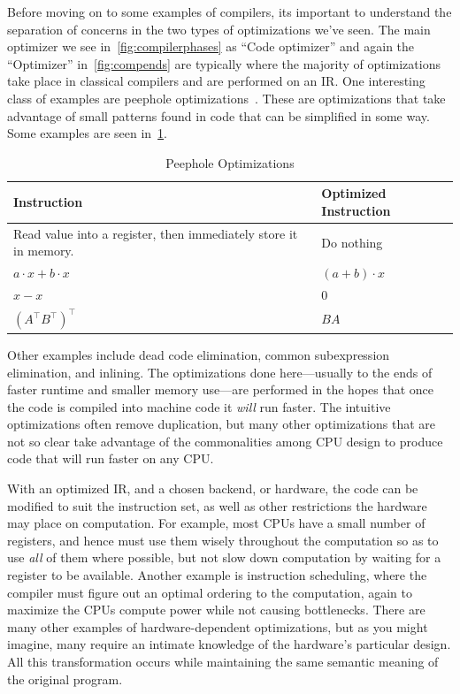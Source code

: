 Before moving on to some examples of compilers, its important to understand the separation of concerns in the two types of optimizations we've seen.
The main optimizer we see in~\cref{fig:compilerphases} as ``Code optimizer'' and again the ``Optimizer'' in~\cref{fig:compends} are typically where the majority of optimizations take place in classical compilers and are performed on an \ac{IR}.
One interesting class of examples are peephole optimizations~\cite{classical-peephole}.
These are optimizations that take advantage of small patterns found in code that can be simplified in some way.
Some examples are seen in~\cref{tab:peephole}.
\begin{table}[ht]
    \centering
    \begin{tabular}{p{}l}
        Instruction                                                      & Optimized Instruction \\ \toprule
        Read value into a register, then immediately store it in memory. & Do nothing            \\
        $a \cdot x + b \cdot x$                                          & $(a + b) \cdot x$     \\
        $x - x$                                                          & $0$                   \\
        $(A^\intercal B^\intercal)^\intercal$                            & $BA$
    \end{tabular}
    \caption{Peephole Optimizations}\label{tab:peephole}
\end{table}
Other examples include dead code elimination, common subexpression elimination, and inlining.
The optimizations done here---usually to the ends of faster runtime and smaller memory use---are performed in the hopes that once the code is compiled into machine code it \emph{will} run faster.
The intuitive optimizations often remove duplication, but many other optimizations that are not so clear take advantage of the commonalities among \ac{CPU} design to produce code that will run faster on any \ac{CPU}.

With an optimized \ac{IR}, and a chosen backend, or hardware, the code can be modified to suit the instruction set, as well as other restrictions the hardware may place on computation.
For example, most \acp{CPU} have a small number of registers, and hence must use them wisely throughout the computation so as to use \emph{all} of them where possible, but not slow down computation by waiting for a register to be available.
Another example is instruction scheduling, where the compiler must figure out an optimal ordering to the computation, again to maximize the \acp{CPU} compute power while not causing bottlenecks.
There are many other examples of hardware-dependent optimizations, but as you might imagine, many require an intimate knowledge of the hardware's particular design.
All this transformation occurs while maintaining the same semantic meaning of the original program.


